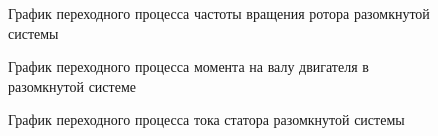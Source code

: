         \begin{figure}[h!]
            \caption{График переходного процесса частоты вращения ротора
                разомкнутой системы}
            \label{fig:open-loop-wm}
        \end{figure}

        \begin{figure}[h!]
            \caption{График переходного процесса момента на валу двигателя в
                разомкнутой системе}
            \label{fig:open-loop-te}
        \end{figure}

        \begin{figure}[h!]
            \caption{График переходного процесса тока статора 
                разомкнутой системы}
            \label{fig:open-loop-is_a}
        \end{figure}

